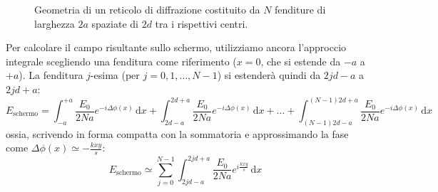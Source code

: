 \documentclass[openany,a4paper,12pt]{book}
\begin{document}
\begin{figure}[H]
    \caption{Geometria di un reticolo di diffrazione costituito da $N$ fenditure di larghezza $2a$ spaziate di $2d$ tra i rispettivi centri.}
\end{figure}

Per calcolare il campo risultante sullo schermo, utilizziamo ancora l'approccio integrale scegliendo una fenditura come riferimento ($x = 0$, che si estende da $-a$ a $+a$). La fenditura $j$-esima (per $j = 0, 1, \dots, N-1$) si estenderà quindi da $2jd - a$ a $2jd + a$:
\[
    E_{\text{schermo}} = \int_{-a}^{+a} \frac{E_0}{2Na} e^{-i\Delta\phi(x)}\,\mathrm{d}x + \int_{2d-a}^{2d+a} \frac{E_0}{2Na} e^{-i\Delta\phi(x)}\,\mathrm{d}x + \dots + \int_{(N-1)2d-a}^{(N-1)2d+a} \frac{E_0}{2Na} e^{-i\Delta\phi(x)}\,\mathrm{d}x
\]
ossia, scrivendo in forma compatta con la sommatoria e approssimando la fase come $\Delta\phi(x) \simeq -\frac{k x y}{s}$:
\[
    E_{\text{schermo}} \simeq \sum_{j=0}^{N-1} \int_{2jd-a}^{2jd+a} \frac{E_0}{2Na} e^{i\frac{k x y}{s}}\,\mathrm{d}x
\]
\end{document}
